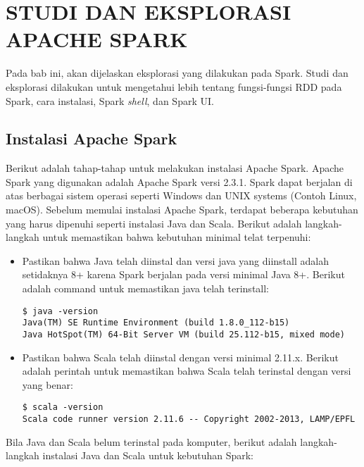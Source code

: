 \chapter{STUDI DAN EKSPLORASI APACHE SPARK}
\label{chap:studi dan eksplorasi}

Pada bab ini, akan dijelaskan eksplorasi yang dilakukan pada Spark. Studi dan eksplorasi dilakukan untuk mengetahui lebih tentang fungsi-fungsi RDD pada Spark, cara instalasi, Spark \textit{shell}, dan Spark UI.

\section{Instalasi Apache Spark}

Berikut adalah tahap-tahap untuk melakukan instalasi Apache Spark. Apache Spark yang  digunakan adalah Apache Spark versi 2.3.1. Spark dapat berjalan di atas berbagai sistem operasi seperti Windows dan UNIX systems (Contoh Linux, macOS). Sebelum memulai instalasi Apache Spark, terdapat beberapa kebutuhan yang harus dipenuhi seperti instalasi Java dan Scala. Berikut adalah langkah-langkah untuk memastikan bahwa kebutuhan minimal telat terpenuhi:

\begin{itemize}

\item Pastikan bahwa Java telah diinstal dan versi java yang diinstall adalah setidaknya 8+ karena Spark berjalan pada versi minimal Java 8+. Berikut adalah command untuk memastikan java telah terinstall:

\begin{verbatim}
$ java -version
Java(TM) SE Runtime Environment (build 1.8.0_112-b15)                                                                   Java HotSpot(TM) 64-Bit Server VM (build 25.112-b15, mixed mode) 
\end{verbatim}


\item Pastikan bahwa Scala telah diinstal dengan versi minimal 2.11.x. Berikut adalah perintah untuk memastikan bahwa Scala telah terinstal dengan versi yang benar:

\begin{verbatim}
$ scala -version
Scala code runner version 2.11.6 -- Copyright 2002-2013, LAMP/EPFL
\end{verbatim}

\end{itemize} 

Bila Java dan Scala belum terinstal pada komputer, berikut adalah langkah-langkah instalasi Java dan Scala untuk kebutuhan Spark:

